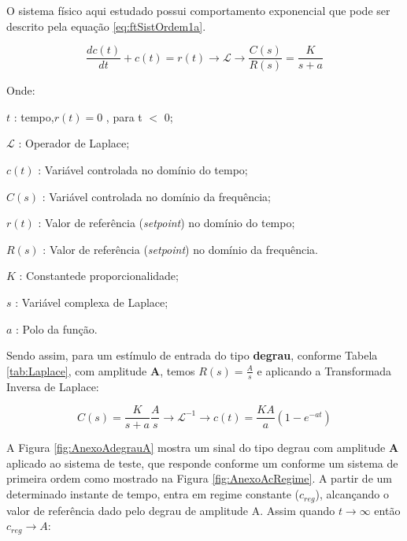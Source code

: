 O sistema físico aqui estudado possui comportamento exponencial que pode ser descrito pela equação \ref{eq:ftSistOrdem1a}. 




\begin{equation}
	 \frac{d c(t)}{dt} + c(t) = r(t) \rightarrow  \mathscr{L} \to \frac{C(s)}{R(s)} = \frac{K}{s + a} 
\label{eq:ftSistOrdem1a}
\end{equation}


Onde:

\setlength{\parindent}{2cm}

$t$ : tempo,$ r(t) = 0$ , para t $<$ 0;

$\mathscr{L}$ : Operador de Laplace;

$c(t)$ : Variável controlada no domínio do tempo;

$C(s)$ : Variável controlada no domínio da frequência;

$r(t)$ : Valor de referência (\emph{setpoint}) no domínio do tempo;

$R(s)$ : Valor de referência (\emph{setpoint}) no domínio da frequência.

$K$ : Constantede proporcionalidade;

$s$ : Variável complexa de Laplace;

$a$ : Polo da função.
\setlength{\parindent}{1cm}

Sendo assim, para um estímulo de entrada do tipo \textbf{degrau}, conforme Tabela \ref{tab:Laplace}, com amplitude \textbf{A}, temos $ R(s) = \frac{A}{s}$ e aplicando a Transformada Inversa de Laplace:

\begin{equation}
C(s) = \frac{K}{s+a} \frac{A}{s} \rightarrow \mathscr{L}^{-1} \to c(t) = \frac{K A}{a} (1 - e^{-at})
\label{eq:degrauAa}
\end{equation}

A Figura \ref{fig:AnexoAdegrauA}
mostra um sinal do tipo degrau com amplitude \textbf{A} aplicado ao sistema de teste, que responde conforme um conforme um sistema de primeira ordem como mostrado na Figura \ref{fig:AnexoAcRegime}. A partir de um determinado instante de tempo, entra em regime constante ($c_{reg}$), alcançando o valor de referência dado pelo degrau de amplitude A. Assim quando $ t \rightarrow \infty $  então $ c_{reg} \rightarrow A $:


